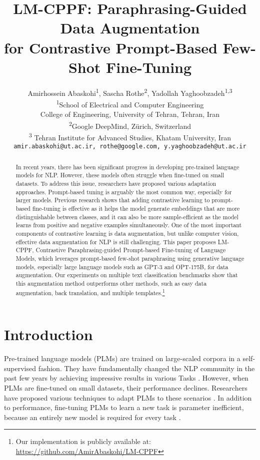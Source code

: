 \documentclass[11pt]{article}
\title{LM-CPPF: Paraphrasing-Guided Data Augmentation \\ 
for Contrastive Prompt-Based Few-Shot Fine-Tuning}
\author{
  Amirhossein Abaskohi\textsuperscript{1}, Sascha Rothe\textsuperscript{2}, Yadollah Yaghoobzadeh\textsuperscript{1,3} \\
  \textsuperscript{1}School of Electrical and Computer Engineering \\ College of Engineering, University of Tehran, Tehran, Iran \\
  \textsuperscript{2}Google DeepMind, Zürich, Switzerland \\
  \textsuperscript{3} Tehran Institute for Advanced Studies, Khatam University, Iran\\
\normalsize{\texttt{amir.abaskohi@ut.ac.ir, rothe@google.com, y.yaghoobzadeh@ut.ac.ir}}
}
\begin{document}
\maketitle

\begin{abstract}

In recent years, there has been significant progress in developing pre-trained language models for NLP. However, these models often struggle when fine-tuned on small datasets. To address this issue, researchers have proposed various adaptation approaches. Prompt-based tuning is arguably the most common way, especially for larger models. Previous research shows that adding contrastive learning to prompt-based fine-tuning is effective as it helps the model generate embeddings that are more distinguishable between classes, and it can also be more sample-efficient as the model learns from positive and negative examples simultaneously. One of the most important components of contrastive learning is data augmentation, but unlike computer vision, effective data augmentation for NLP is still challenging. This paper proposes LM-CPPF, Contrastive Paraphrasing-guided Prompt-based Fine-tuning of Language Models, which leverages prompt-based few-shot paraphrasing using generative language models, especially large language models such as GPT-3 and OPT-175B, for data augmentation. Our experiments on multiple text classification benchmarks show that this augmentation method outperforms other methods, such as easy data augmentation, back translation, and multiple templates.\footnote{Our implementation is publicly available at:  \url{https://github.com/AmirAbaskohi/LM-CPPF}}

\end{abstract}

\section{Introduction}
\label{sec:introduction}

Pre-trained language models (PLMs) are trained on large-scaled corpora in a self-supervised fashion. They have fundamentally changed the NLP community in the past few years by achieving impressive results in various Tasks \cite{devlin2018bert, radford2018improving, yang2019xlnet, chiang-etal-2022-recent}. However, when PLMs are fine-tuned on small datasets, their performance declines. Researchers have proposed various techniques to adapt PLMs to these scenarios \cite{snell2017prototypical, sung2018learning}. In addition to performance, fine-tuning PLMs to learn a new task is parameter inefficient, because an entirely new model is required for every task \cite{houlsby2019parameter}. 
\end{document}
